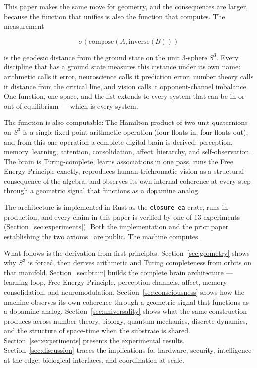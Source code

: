\documentclass[12pt,a4paper]{article}
\theoremstyle{definition}
\theoremstyle{remark}
\begin{document}
This paper makes the same move for geometry, and the consequences are
larger, because the function that unifies is also the function that
computes. The measurement

\[
  \sigma(\mathrm{compose}(A, \mathrm{inverse}(B)))
\]

is the geodesic distance from the ground state on the unit 3-sphere $S^3$.
Every discipline that has a ground state measures this distance under its
own name: arithmetic calls it error, neuroscience calls it prediction error,
number theory calls it distance from the critical line, and vision calls it
opponent-channel imbalance. One function, one space, and the list extends
to every system that can be in or out of equilibrium --- which is every
system.

The function is also computable: The Hamilton product of two unit quaternions
on $S^3$ is a single fixed-point arithmetic operation (four floats in, four
floats out), and from this one operation a complete digital brain is derived:
perception, memory, learning, attention, consolidation, affect, hierarchy,
and self-observation. The brain is Turing-complete, learns associations in
one pass, runs the Free Energy Principle exactly, reproduces human
trichromatic vision as a structural consequence of the algebra, and observes
its own internal coherence at every step through a geometric signal that
functions as a dopamine analog.

The architecture is implemented in Rust as the \texttt{closure\_ea} crate,
runs in production, and every claim in this paper is verified by one of 13
experiments (Section~\ref{sec:experiments}). Both the implementation and the prior paper
establishing the two axioms~\cite{alves2026zeroth} are public. The machine computes.

What follows is the derivation from first principles. Section~\ref{sec:geometry}
shows why $S^3$ is forced, then derives arithmetic and Turing completeness
from orbits on that manifold. Section~\ref{sec:brain} builds the complete brain
architecture --- learning loop, Free Energy Principle, perception channels,
affect, memory consolidation, and neuromodulation. Section~\ref{sec:consciousness}
shows how the machine observes its own coherence through a geometric signal
that functions as a dopamine analog. Section~\ref{sec:universality} shows what
the same construction produces across number theory, biology, quantum mechanics,
discrete dynamics, and the structure of space-time when the substrate is shared.
Section~\ref{sec:experiments} presents the experimental results. Section~\ref{sec:discussion} traces the implications for hardware,
security, intelligence at the edge, biological interfaces, and coordination
at scale.
\end{document}

